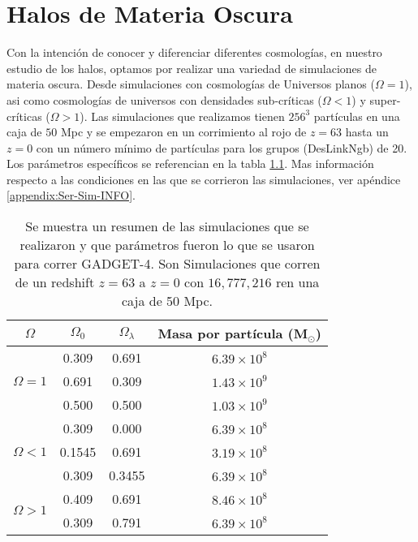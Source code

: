 \chapter{Halos de Materia Oscura}
\setcounter{equation}{0}

\noindent Con la intención de conocer y diferenciar diferentes cosmologías, en nuestro estudio de los halos, optamos por realizar una variedad de simulaciones de materia oscura. Desde simulaciones con cosmologías de Universos planos ($\Omega = 1$), asi como cosmologías  de universos con densidades sub-críticas ($\Omega < 1$) y super-críticas ($\Omega > 1$). Las simulaciones que realizamos {\blues tienen $256^3$ partículas en una caja de $50$ Mpc y se} empezaron en un corrimiento al rojo de $z=63$ hasta un $z=0$ {\blues con un número mínimo de partículas para los grupos (DesLinkNgb) de 20. Los parámetros específicos se referencian en la tabla \ref{tab:Resumen_Sim}.} Mas información respecto a las condiciones en las que se corrieron las simulaciones, ver apéndice \ref{appendix:Ser-Sim-INFO}.

{\blues 
\begin{table}[H]
    \centering
    \begin{tabular}{|c|c|c|c|}
    
        \hline
        $\Omega$ & $\Omega_0$ & $\Omega_\lambda$ & Masa por partícula (M$_\odot$) \\ \hline
        \multirow{3}{*}{$\Omega = 1$} & 0.309 & 0.691 & $6.39 \times 10^8$ \\ \cline{2-4} 
         & 0.691 & 0.309 & $1.43 \times 10^9$ \\ \cline{2-4} 
         & 0.500 & 0.500 & $1.03 \times 10^9$ \\ \hline
        \multirow{3}{*}{$\Omega < 1$} & 0.309 & 0.000 & $6.39 \times 10^8$ \\ \cline{2-4} 
         & 0.1545 & 0.691 & $3.19 \times 10^8$ \\ \cline{2-4} 
         & 0.309 & 0.3455 & $6.39 \times 10^8$ \\ \hline
        \multirow{2}{*}{$\Omega > 1$} & 0.409 & 0.691 & $8.46 \times 10^8$ \\ \cline{2-4} 
         & 0.309 & 0.791 & $6.39 \times 10^8$ \\ \hline
    
    \end{tabular}
    
    \caption{Se muestra un resumen de las simulaciones que se realizaron y que parámetros fueron lo que se usaron para correr GADGET-4. Son Simulaciones que corren de un redshift $z=63$ a $z=0$ con $16,777,216$ ren una caja de 50 Mpc.}
    
    \label{tab:Resumen_Sim}

\end{table}
}

